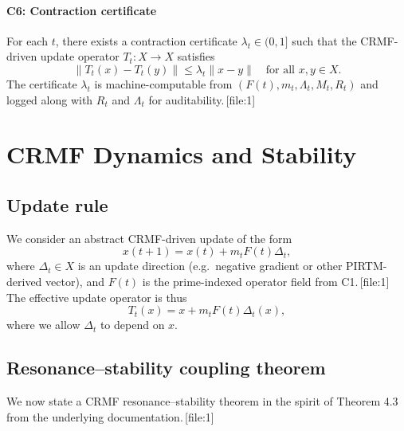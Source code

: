 \documentclass[11pt]{article}
\begin{document}
\paragraph{C6: Contraction certificate}

\begin{description}[leftmargin=1.5em]
\item[C6.] For each $t$, there exists a contraction certificate $\lambda_t \in (0,1]$ such that the CRMF-driven update operator $T_t : X \to X$ satisfies
\[
  \|T_t(x) - T_t(y)\| \leq \lambda_t \|x - y\| \quad \text{for all } x,y \in X.
\]
The certificate $\lambda_t$ is machine-computable from $(F(t), m_t, \Lambda_t, M_t, R_t)$ and logged along with $R_t$ and $\Lambda_t$ for auditability.\,[file:1]
\end{description}

\section{CRMF Dynamics and Stability}

\subsection{Update rule}

We consider an abstract CRMF-driven update of the form
\begin{equation}
  x(t+1) = x(t) + m_t F(t) \Delta_t, \label{eq:update}
\end{equation}
where $\Delta_t \in X$ is an update direction (e.g.\ negative gradient or other PIRTM-derived vector), and $F(t)$ is the prime-indexed operator field from C1.\,[file:1]
The effective update operator is thus
\[
  T_t(x) = x + m_t F(t)\Delta_t(x),
\]
where we allow $\Delta_t$ to depend on $x$.

\subsection{Resonance--stability coupling theorem}

We now state a CRMF resonance--stability theorem in the spirit of Theorem 4.3 from the underlying documentation.\,[file:1]
\end{document}
